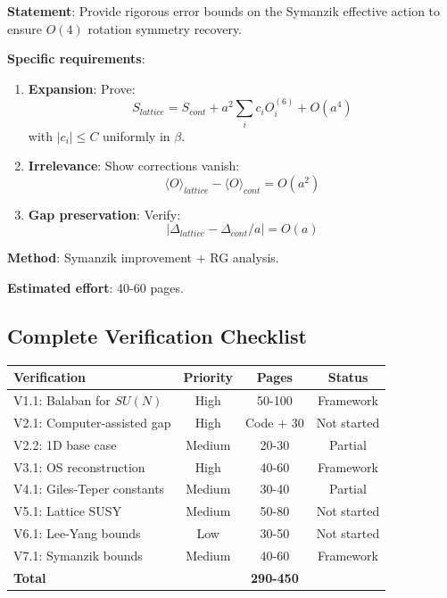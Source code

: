 \begin{verification}
\textbf{Statement}: Provide rigorous error bounds on the Symanzik effective 
action to ensure $O(4)$ rotation symmetry recovery.

\textbf{Specific requirements}:
\begin{enumerate}
\item \textbf{Expansion}: Prove:
\begin{equation}
S_{lattice} = S_{cont} + a^2 \sum_i c_i O_i^{(6)} + O(a^4)
\end{equation}
with $|c_i| \leq C$ uniformly in $\beta$.

\item \textbf{Irrelevance}: Show corrections vanish:
\begin{equation}
\langle O \rangle_{lattice} - \langle O \rangle_{cont} = O(a^2)
\end{equation}

\item \textbf{Gap preservation}: Verify:
\begin{equation}
|\Delta_{lattice} - \Delta_{cont}/a| = O(a)
\end{equation}
\end{enumerate}

\textbf{Method}: Symanzik improvement + RG analysis.

\textbf{Estimated effort}: 40-60 pages.
\end{verification}

\subsection{Complete Verification Checklist}

\begin{center}
\begin{tabular}{|l|c|c|c|}
\hline
\textbf{Verification} & \textbf{Priority} & \textbf{Pages} & \textbf{Status} \\
\hline
V1.1: Balaban for $SU(N)$ & High & 50-100 & Framework \\
V2.1: Computer-assisted gap & High & Code + 30 & Not started \\
V2.2: 1D base case & Medium & 20-30 & Partial \\
V3.1: OS reconstruction & High & 40-60 & Framework \\
V4.1: Giles-Teper constants & Medium & 30-40 & Partial \\
V5.1: Lattice SUSY & Medium & 50-80 & Not started \\
V6.1: Lee-Yang bounds & Low & 30-50 & Not started \\
V7.1: Symanzik bounds & Medium & 40-60 & Framework \\
\hline
\textbf{Total} & & \textbf{290-450} & \\
\hline
\end{tabular}
\end{center}

